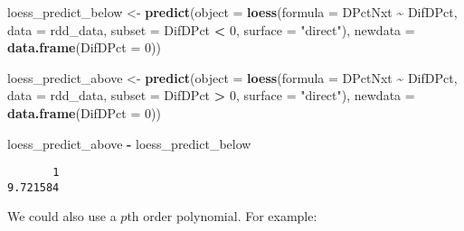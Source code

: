 \documentclass[
  12pt,
  leqno]{article}
\newenvironment{Shaded}{\begin{snugshade}}{\end{snugshade}}
\newcommand{\AttributeTok}[1]{\textcolor[rgb]{0.13,0.29,0.53}{#1}}
\newcommand{\DecValTok}[1]{\textcolor[rgb]{0.00,0.00,0.81}{#1}}
\newcommand{\FunctionTok}[1]{\textcolor[rgb]{0.13,0.29,0.53}{\textbf{#1}}}
\newcommand{\NormalTok}[1]{#1}
\newcommand{\OtherTok}[1]{\textcolor[rgb]{0.56,0.35,0.01}{#1}}
\newcommand{\SpecialCharTok}[1]{\textcolor[rgb]{0.81,0.36,0.00}{\textbf{#1}}}
\newcommand{\StringTok}[1]{\textcolor[rgb]{0.31,0.60,0.02}{#1}}
\begin{document}
\begin{Shaded}
\begin{Highlighting}[]
\NormalTok{loess\_predict\_below }\OtherTok{\textless{}{-}} \FunctionTok{predict}\NormalTok{(}\AttributeTok{object =} \FunctionTok{loess}\NormalTok{(}\AttributeTok{formula =}\NormalTok{ DPctNxt }\SpecialCharTok{\textasciitilde{}}\NormalTok{ DifDPct, }\AttributeTok{data =}\NormalTok{ rdd\_data,}
    \AttributeTok{subset =}\NormalTok{ DifDPct }\SpecialCharTok{\textless{}} \DecValTok{0}\NormalTok{, }\AttributeTok{surface =} \StringTok{"direct"}\NormalTok{), }\AttributeTok{newdata =} \FunctionTok{data.frame}\NormalTok{(}\AttributeTok{DifDPct =} \DecValTok{0}\NormalTok{))}

\NormalTok{loess\_predict\_above }\OtherTok{\textless{}{-}} \FunctionTok{predict}\NormalTok{(}\AttributeTok{object =} \FunctionTok{loess}\NormalTok{(}\AttributeTok{formula =}\NormalTok{ DPctNxt }\SpecialCharTok{\textasciitilde{}}\NormalTok{ DifDPct, }\AttributeTok{data =}\NormalTok{ rdd\_data,}
    \AttributeTok{subset =}\NormalTok{ DifDPct }\SpecialCharTok{\textgreater{}} \DecValTok{0}\NormalTok{, }\AttributeTok{surface =} \StringTok{"direct"}\NormalTok{), }\AttributeTok{newdata =} \FunctionTok{data.frame}\NormalTok{(}\AttributeTok{DifDPct =} \DecValTok{0}\NormalTok{))}

\NormalTok{loess\_predict\_above }\SpecialCharTok{{-}}\NormalTok{ loess\_predict\_below}
\end{Highlighting}
\end{Shaded}

\begin{verbatim}
       1 
9.721584 
\end{verbatim}

\normalsize

We could also use a \(p\)th order polynomial. For example:

\scriptsize
\end{document}
